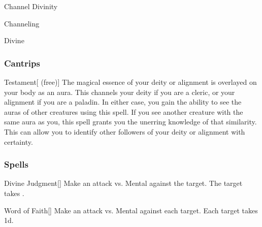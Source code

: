 \newpage
\begin{spellsection}{Channel Divinity}

\begin{spellheader}
\end{spellheader}


 Channeling

 Divine

\subsubsection{Cantrips}


\begin{freeability}{Testament}[ (free)]
The magical essence of your deity or alignment is overlayed on your body as an aura.
This channels your deity if you are a cleric, or your alignment if you are a paladin.
In either case, you gain the ability to see the auras of other creatures using this spell.
If you see another creature with the same aura as you, this spell grants you the unerring knowledge of that similarity.
This can allow you to identify other followers of your deity or alignment with certainty.
\end{freeability}

\end{spellsection}


\subsubsection{Spells}


\lowercase{\hypertarget{spell:Divine Judgment}{}}\label{spell:Divine Judgment}
\begin{freeability}[Rank 1]{\hypertarget{spell:Divine Judgment}{Divine Judgment}}[]
Make an attack vs. Mental against the target.
\hit The target takes .
\end{freeability}
\vspace{0.25em}



\lowercase{\hypertarget{spell:Word of Faith}{}}\label{spell:Word of Faith}
\begin{freeability}[Rank 3]{\hypertarget{spell:Word of Faith}{Word of Faith}}[]
Make an attack vs. Mental against each target.
\hit Each target takes  \minus1d.
\end{freeability}
\vspace{0.25em}



